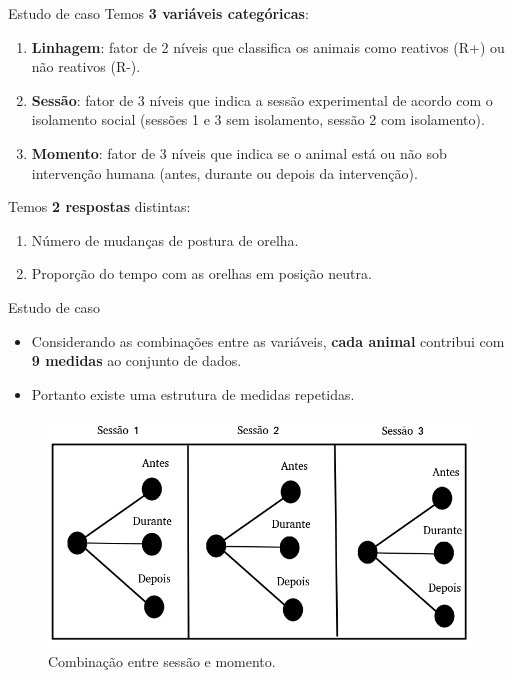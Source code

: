 \documentclass[
  ignorenonframetext,
  serif,
  professionalfont,
  usenames,
  dvipsnames,
  aspectratio = 169]{beamer}
\providecommand{\tightlist}{%
  \setlength{\itemsep}{0pt}\setlength{\parskip}{0pt}}
\renewcommand{\tightlist}{%
  \setlength{\itemsep}{0\baselineskip}
  \setlength{\parskip}{0.25\baselineskip}
}
\begin{document}
\begin{frame}{Estudo de caso}
\protect\hypertarget{estudo-de-caso-9}{}
Temos \textbf{3 variáveis categóricas}:

\begin{enumerate}
\item
  \textbf{Linhagem}: fator de 2 níveis que classifica os animais como
  reativos (R+) ou não reativos (R-).
\item
  \textbf{Sessão}: fator de 3 níveis que indica a sessão experimental de
  acordo com o isolamento social (sessões 1 e 3 sem isolamento, sessão 2
  com isolamento).
\item
  \textbf{Momento}: fator de 3 níveis que indica se o animal está ou não
  sob intervenção humana (antes, durante ou depois da intervenção).
\end{enumerate}

Temos \textbf{2 respostas} distintas:

\begin{enumerate}
\tightlist
\item
  Número de mudanças de postura de orelha.
\item
  Proporção do tempo com as orelhas em posição neutra.
\end{enumerate}
\end{frame}

\begin{frame}{Estudo de caso}
\protect\hypertarget{estudo-de-caso-10}{}
\begin{itemize}
\item
  Considerando as combinações entre as variáveis, \textbf{cada animal}
  contribui com \textbf{9 medidas} ao conjunto de dados.
\item
  Portanto existe uma estrutura de medidas repetidas.
\end{itemize}

\begin{figure}

{\centering \includegraphics[width=0.55\linewidth]{./img/se_mo} 

}

\caption{Combinação entre sessão e momento.}\label{fig:unnamed-chunk-9}
\end{figure}
\end{frame}
\end{document}

